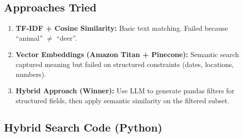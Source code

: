 \documentclass[11pt,a4paper]{article}
\begin{document}
\subsection{Approaches Tried}

\begin{enumerate}[nosep]
  \item \textbf{TF-IDF + Cosine Similarity:} Basic text matching. Failed because ``animal'' $\neq$ ``deer''.
  \item \textbf{Vector Embeddings (Amazon Titan + Pinecone):} Semantic search captured meaning but failed on structured constraints (dates, locations, numbers).
  \item \textbf{Hybrid Approach (Winner):} Use LLM to generate pandas filters for structured fields, then apply semantic similarity on the filtered subset.
\end{enumerate}

\subsection{Hybrid Search Code (Python)}
\end{document}
